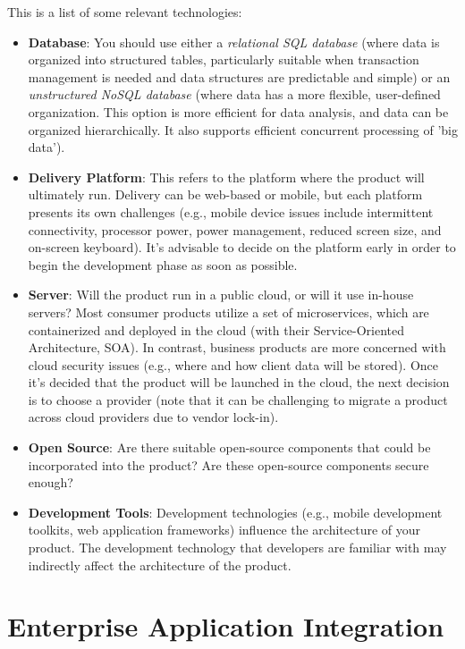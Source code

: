 \newpage
\noindent
This is a list of some relevant technologies:
\begin{itemize}
    \item \textbf{Database}: You should use either a \textit{relational SQL database} (where data is organized into structured tables, particularly suitable when transaction management is needed and data structures are predictable and simple) or an \textit{unstructured NoSQL database} (where data has a more flexible, user-defined organization. This option is more efficient for data analysis, and data can be organized hierarchically. It also supports efficient concurrent processing of 'big data').
    \item \textbf{Delivery Platform}: This refers to the platform where the product will ultimately run. Delivery can be web-based or mobile, but each platform presents its own challenges (e.g., mobile device issues include intermittent connectivity, processor power, power management, reduced screen size, and on-screen keyboard). It's advisable to decide on the platform early in order to begin the development phase as soon as possible.
    \item \textbf{Server}: Will the product run in a public cloud, or will it use in-house servers? Most consumer products utilize a set of microservices, which are containerized and deployed in the cloud (with their Service-Oriented Architecture, SOA). In contrast, business products are more concerned with cloud security issues (e.g., where and how client data will be stored). Once it's decided that the product will be launched in the cloud, the next decision is to choose a provider (note that it can be challenging to migrate a product across cloud providers due to vendor lock-in).
    \item \textbf{Open Source}: Are there suitable open-source components that could be incorporated into the product? Are these open-source components secure enough?
    \item \textbf{Development Tools}: Development technologies (e.g., mobile development toolkits, web application frameworks) influence the architecture of your product. The development technology that developers are familiar with may indirectly affect the architecture of the product.
\end{itemize}

\section{Enterprise Application Integration}

